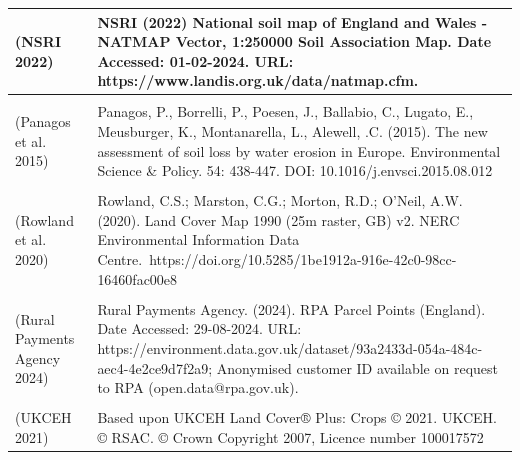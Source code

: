 \documentclass[
  12pt,
  letterpaper,
  DIV=11,
  numbers=noendperiod]{scrartcl}
\begin{document}
\begin{longtable}[t]{>{\raggedright\arraybackslash}p{10em}|>{\raggedright\arraybackslash}p{50em}}
\hline
(NSRI 2022) & NSRI (2022) National soil map of England and Wales - NATMAP Vector, 1:250000 Soil Association Map.  Date Accessed: 01-02-2024. URL: https://www.landis.org.uk/data/natmap.cfm.\\
\hline
\cellcolor{gray!10}{(Ordanance Survey 2024)} & \cellcolor{gray!10}{Ordanance Survey. (2024). OS Open Rivers. Date Accessed: 01-06-2024. URL: https://www.data.gov.uk/dataset/dc29160b-b163-4c6e-8817-f313229bcc23/os-open-rivers}\\
\hline
(Panagos et al. 2015) & Panagos, P., Borrelli, P., Poesen, J., Ballabio, C., Lugato, E., Meusburger, K., Montanarella, L., Alewell, .C. (2015). The new assessment of soil loss by water erosion in Europe. Environmental Science \& Policy. 54: 438-447. DOI: 10.1016/j.envsci.2015.08.012\\
\hline
\cellcolor{gray!10}{(Round 1978)} & \cellcolor{gray!10}{Round, P. D. (1978) An ornithological survey of the Somerset Levels 1976-77. A joint Wessex Water Authority and Royal Society for the Protection of Birds project.}\\
\hline
(Rowland et al. 2020) & Rowland, C.S.; Marston, C.G.; Morton, R.D.; O’Neil, A.W. (2020). Land Cover Map 1990 (25m raster, GB) v2. NERC Environmental Information Data Centre. https://doi.org/10.5285/1be1912a-916e-42c0-98cc-16460fac00e8\\
\hline
\cellcolor{gray!10}{(RSPB 2018)} & \cellcolor{gray!10}{RSPB. (2018). Sustainable Shores habitat creation opportunities WFS. Date Accessed: 01-07-2024. URL: https://opendata-rspb.opendata.arcgis.com/maps/24944d24920a445cb82b724c69715b59/about}\\
\hline
(Rural Payments Agency 2024) & Rural Payments Agency. (2024). RPA Parcel Points (England). Date Accessed: 29-08-2024. URL: https://environment.data.gov.uk/dataset/93a2433d-054a-484c-aec4-4e2ce9d7f2a9; Anonymised customer ID available on request to RPA (open.data@rpa.gov.uk).\\
\hline
\cellcolor{gray!10}{(Somerset Drainage Board Consortium 2011)} & \cellcolor{gray!10}{Somerset Drainage Board Consortium. (2011). Curry Moor Water Level Management Plan. Date Accessed: 29-08-2024. URL: https://somersetdrainageboards.gov.uk/environment/wlmps/}\\
\hline
(UKCEH 2021) & Based upon UKCEH Land Cover® Plus: Crops © 2021. UKCEH. © RSAC. © Crown Copyright 2007, Licence number 100017572\\
\hline

\end{longtable}

\endgroup{}
\end{document}

